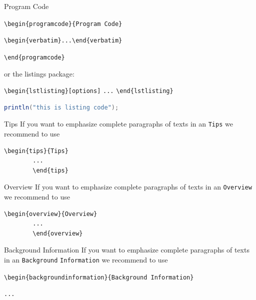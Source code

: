\begin{bibunit}
	\begin{programcode}{Program Code}
		
		\verb|\begin{programcode}{Program Code}|
		
		\verb|\begin{verbatim}...\end{verbatim}|
		
		\verb|\end{programcode}|
		
		or the listings package:
		
		\verb|\begin{lstlisting}[options]|
		\verb|...|
		\verb|\end{lstlisting}|
		
	\end{programcode}
	
	\begin{lstlisting}[language=Java,frame=single,caption={Sample Java Code},captionpos=b,label={listing:1}]
	println("this is listing code");
	\end{lstlisting}
	
	\begin{tips}{Tips}
		If you want to emphasize complete paragraphs of texts in an \verb|Tips| we recommend to
		use  \begin{verbatim}\begin{tips}{Tips}
		...
		\end{tips}\end{verbatim}
	\end{tips}
	
	
	\begin{overview}{Overview}
		If you want to emphasize complete paragraphs of texts in an \verb|Overview| we recommend to
		use  \begin{verbatim}\begin{overview}{Overview}
		...
		\end{overview}\end{verbatim}
	\end{overview}
	\begin{backgroundinformation}{Background Information}
		If you want to emphasize complete paragraphs of texts in an \verb|Background|
		\verb|Information| we recommend to
		use
		
		\verb|\begin{backgroundinformation}{Background Information}|
		
		\verb|...|
		

\end{backgroundinformation}
\end{bibunit}
